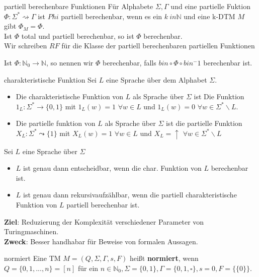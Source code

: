 
\begin{defn}{partiell berechenbare Funktionen}
    Für Alphabete $\Sigma, \Gamma$ und eine partielle Fuktion $\Phi : \Sigma^* \rightsquigarrow 
    \Gamma$ ist $Phi$ partiell berechenbar, wenn es ein $k \ in \mathbb{N}$ und eine k-DTM $M$ gibt $\Phi_M = \Phi$. \\

    Ist $\Phi$ total und partiell berechenbar, so ist $\Phi$ berechenbar. \\

    Wir schreiben $RF$ für die Klasse der partiell berechenbaren partiellen Funktionen

    Ist $\Phi : \mathbb{N}_0 \rightarrow \mathbb{N}$, so nennen wir $\Phi$ berechenbar,
    falls $bin \circ \Phi \circ bin^-1$ berechenbar ist.
\end{defn}

\begin{defn}{charakteristische Funktion}
    Sei $L$ eine Sprache über dem Alphabet $\Sigma$. \\
    \begin{itemize}
        \item Die charakteristische Funktion von $L$ als Sprache über $\Sigma$ ist Die
              Funktion $1_L : \Sigma^* \rightarrow \{0,1\}$ mit $1_L(w) = 1$ $\forall w \in L$
              und $1_L(w) = 0$ $\forall w \in \Sigma^* \backslash L$.
        \item Die partielle funktion von $L$ als Sprache über $\Sigma$ ist die partielle Funktion
              $X_L : \Sigma^* \leadsto \{1\}$ mit $X_L(w) = 1$ $\forall w \in L$ und $X_L = \uparrow$ $\forall w \in \Sigma^* \backslash L$
    \end{itemize}
\end{defn}

\begin{bem}
    Sei $L$ eine Sprache über $\Sigma$\\
    \begin{itemize}
        \item $L$ ist genau dann entscheidbar, wenn die char. Funktion von $L$ berechenbar ist.
        \item $L$ ist genau dann rekursivaufzählbar, wenn die partiell charakteristische Funktion von $L$
              partiell berechenbar ist.
    \end{itemize}
\end{bem}

\textbf{Ziel}: Reduzierung der Komplexität verschiedener Parameter von Turingmaschinen. \\
\textbf{Zweck}: Besser handhabar für Beweise von formalen Aussagen. \\

\begin{defn}{normiert}
    Eine TM $M = (Q, \Sigma, \Gamma, s, F)$ heißt \textbf{normiert}, wenn $Q = \{0,1,...,n\} = [n]$ für ein
    $n \in \mathbb{N}_0, \Sigma = \{0,1\}, \Gamma = \{0,1,\square\}, s=0, F = \{\{0\}\}$.
\end{defn}
